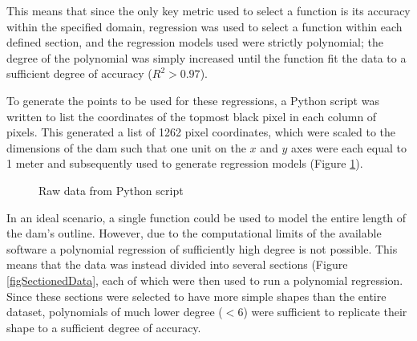 \documentclass{article}
\begin{document}
    This means that since the only key metric used to select a function is its accuracy within the specified domain, regression was used to select a function within each defined section, and the regression models used were strictly polynomial; the degree of the polynomial was simply increased until the function fit the data to a sufficient degree of accuracy ($R^2 > 0.97$).

    To generate the points to be used for these regressions, a Python script was written to list the coordinates of the topmost black pixel in each column of pixels. This generated a list of 1262 pixel coordinates, which were scaled to the dimensions of the dam such that one unit on the $x$ and $y$ axes were each equal to 1 meter and subsequently used to generate regression models (Figure \ref{figRawData}).

    \begin{figure}
        \centering
        \caption{Raw data from Python script}
        \label{figRawData}
    \end{figure}

    In an ideal scenario, a single function could be used to model the entire length of the dam's outline. However, due to the computational limits of the available software a polynomial regression of sufficiently high degree is not possible. This means that the data was instead divided into several sections (Figure \ref{figSectionedData}, each of which were then  used to run a polynomial regression. Since these sections were selected to have more simple shapes than the entire dataset, polynomials of much lower degree ($< 6$) were sufficient to replicate their shape to a sufficient degree of accuracy.
\end{document}

